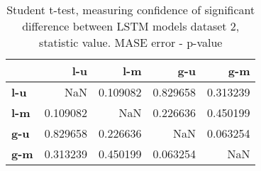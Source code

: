 \begin{table}[h]
\centering
\caption{Student t-test, measuring confidence of significant difference between LSTM models dataset 2, statistic value. MASE error - p-value}
\label{table:ttest-p-values-lstm-experiments-MASE-dataset-2}
\begin{tabular}{lrrrr}
\toprule
{} &       l-u &       l-m &       g-u &       g-m \\
\midrule
\textbf{l-u} &       NaN &  0.109082 &  0.829658 &  0.313239 \\
\textbf{l-m} &  0.109082 &       NaN &  0.226636 &  0.450199 \\
\textbf{g-u} &  0.829658 &  0.226636 &       NaN &  0.063254 \\
\textbf{g-m} &  0.313239 &  0.450199 &  0.063254 &       NaN \\
\bottomrule
\end{tabular}
\end{table}
